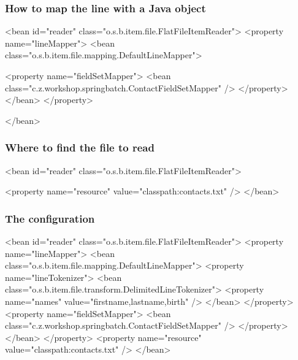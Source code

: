\begin{frame}[fragile]
 \frametitle{How to map the line with a Java object}


\begin{xmlcode}
<bean id="reader"
      class="o.s.b.item.file.FlatFileItemReader">
  <property name="lineMapper">
    <bean class="o.s.b.item.file.mapping.DefaultLineMapper">





      <property name="fieldSetMapper">
        <bean class="c.z.workshop.springbatch.ContactFieldSetMapper" />
      </property>
    </bean>
  </property>

</bean>
\end{xmlcode}

\end{frame}

\begin{frame}[fragile]
 \frametitle{Where to find the file to read}

\begin{xmlcode}
<bean id="reader"
      class="o.s.b.item.file.FlatFileItemReader">












  <property name="resource" value="classpath:contacts.txt" />
</bean>
\end{xmlcode}

\end{frame}

\begin{frame}[fragile]
 \frametitle{The  configuration}

\begin{xmlcode}
<bean id="reader"
      class="o.s.b.item.file.FlatFileItemReader">
  <property name="lineMapper">
    <bean class="o.s.b.item.file.mapping.DefaultLineMapper">
      <property name="lineTokenizer">
        <bean class="o.s.b.item.file.transform.DelimitedLineTokenizer">
          <property name="names" value="firstname,lastname,birth" />
        </bean>
      </property>
      <property name="fieldSetMapper">
        <bean class="c.z.workshop.springbatch.ContactFieldSetMapper" />
      </property>
    </bean>
  </property>
  <property name="resource" value="classpath:contacts.txt" />
</bean>
\end{xmlcode}

\end{frame}

